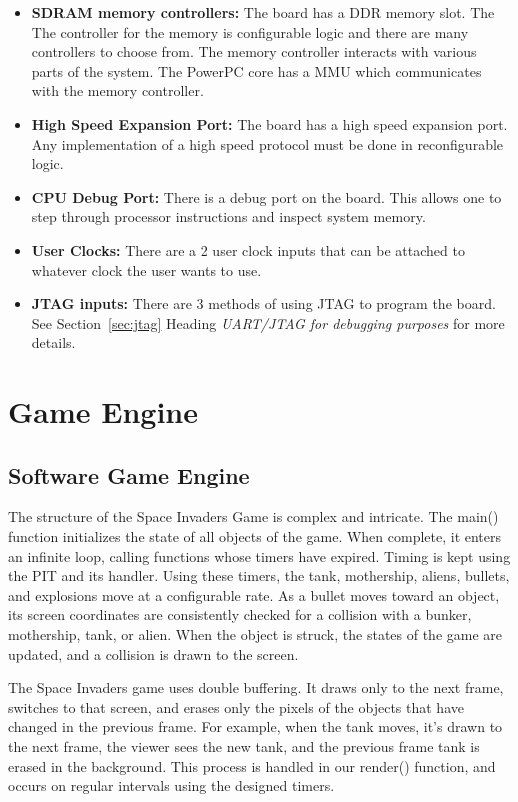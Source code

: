 \documentclass[11pt,letter,oneside]{report}
\begin{document}
\begin{itemize}
		\item \textbf{SDRAM memory controllers:}
			The board has a DDR memory slot.  The The controller for the memory is configurable logic and there are many controllers to choose from.  The memory controller interacts with various parts of the system.  The PowerPC core has a MMU which communicates with the memory controller.
		\item \textbf{High Speed Expansion Port:}
			The board has a high speed expansion port.  Any implementation of a high speed protocol must be done in reconfigurable logic.
		\item \textbf{CPU Debug Port:}
			There is a debug port on the board.  This allows one to step through processor instructions and inspect system memory.
		\item \textbf{User Clocks:}
			There are a 2 user clock inputs that can be attached to whatever clock the user wants to use.
		\item \textbf{JTAG inputs:}
			There are 3 methods of using JTAG to program the board.  See Section~\ref{sec:jtag} Heading \textit{UART/JTAG for debugging purposes} for more details.
	\end{itemize}
\section{Game Engine }

\subsection{Software Game Engine}
The structure of the Space Invaders Game is complex and intricate. The main() function initializes the state of all objects of the game. When complete, it enters an infinite loop, calling functions whose timers have expired. Timing is kept using the PIT and its handler. Using these timers, the tank, mothership, aliens, bullets, and explosions move at a configurable rate. As a bullet moves toward an object, its screen coordinates are consistently checked for a collision with a bunker, mothership, tank, or alien. When the object is struck, the states of the game are updated, and a collision is drawn to the screen.

The Space Invaders game uses double buffering. It draws only to the next frame, switches to that screen, and erases only the pixels of the objects that have changed in the previous frame. For example, when the tank moves, it's drawn to the next frame, the viewer sees the new tank, and the previous frame tank is erased in the background. This process is handled in our render() function, and occurs on regular intervals using the designed timers.
\end{document}
